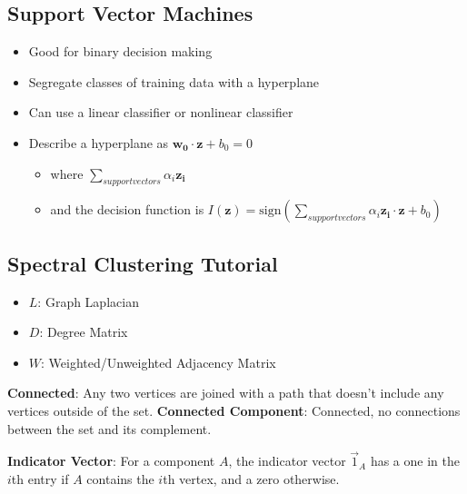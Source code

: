 \documentclass{article}
\begin{document}
        \subsection{Support Vector Machines}
        \begin{itemize}
            \item Good for binary decision making
            \item Segregate classes of training data with a hyperplane
            \item Can use a linear classifier or nonlinear classifier    
            \item Describe a hyperplane as \ensuremath{\mathbf{w_0}\cdot\mathbf{z} +
b_0 = 0}
        
            \begin{itemize}
                \item where \begin{math}\sum_{support vectors}{\alpha_i\mathbf{z_i}}
\end{math}
                \item and the decision function is \begin{math}I(\mathbf{z}) =
\text{sign}\left(\sum_{support vectors}{\alpha_i\mathbf{z_i}\cdot\mathbf{z}+
b_0}\right) \end{math}
            \end{itemize}
        \end{itemize} 

        \subsection{Spectral Clustering Tutorial}   
        \begin{itemize}
            \item \textbf{\ensuremath{L}}: Graph Laplacian
            \item \textbf{\ensuremath{D}}: Degree Matrix
            \item \textbf{\ensuremath{W}}: Weighted/Unweighted Adjacency Matrix
        \end{itemize}
        \textbf{Connected}: Any two vertices are joined with a path that doesn't
include any vertices outside of the set.
        \textbf{Connected Component}: Connected, no connections between the set and
its complement. 

        \textbf{Indicator Vector}: For a component \ensuremath{A}, the indicator
vector \ensuremath{\vec{1}_{A}} has a one in the \ensuremath{i}th entry if
\ensuremath{A} contains the \ensuremath{i}th vertex, and a zero otherwise.
\end{document}

